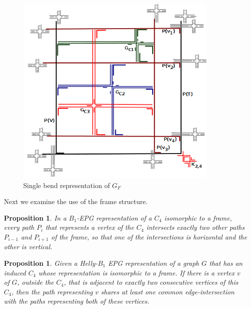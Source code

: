 \documentclass[
submission
]{dmtcs-episciences}
\newtheorem{prop}[theorem]{Proposition}
\begin{document}
%
\begin{figure}[htb]	
\center%
\includegraphics[width=10cm]{formulaFGCompletaPies}
\caption{Single bend representation of $G_F$}
\label{fig:gadgetFormulaCompletaPies}
\end{figure}

Next we examine the use of the frame structure.


\begin{prop}\label{lem:direcoesdiferentes}
In a $B_1$-EPG representation of a $C_4$ isomorphic to a frame, every path $P_i$ that represents a vertex of the $C_4$ intersects exactly two other paths $P_{i-1}$ and $P_{i+1}$ of the frame, so that one of the intersections is horizontal and the other is vertical. %
\end{prop}


\begin{prop}\label{lem:mesmaretasuporte}
Given a Helly-$B_1$ EPG representation of a graph $G$ that has an induced $C_4$ whose representation is isomorphic to a frame. If there is a vertex $v$ of $G$, outside the $C_4$, that is adjacent to exactly two consecutive vertices of this $C_4$, then the path representing $v$ shares at least one common edge-intersection with the paths representing both of these vertices.%
\end{prop}
\end{document}
